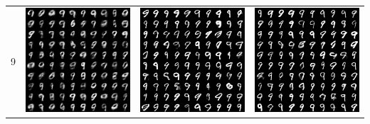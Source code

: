 \documentclass[12pt,a4paper]{article}
\begin{document}
\begin{table}
\begin{tabular}{cccc}
			9 & \includegraphics[width=4cm]{Figures/Epoch1_Label9} & \includegraphics[width=4cm]{Figures/Epoch50_Label9} & \includegraphics[width=4cm]{Figures/Epoch100_Label9}
		\end{tabular}
	\end{table}
\end{document}
